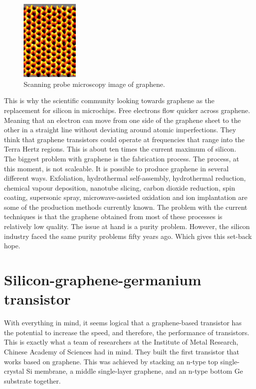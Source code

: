 \documentclass[conference, 10pt]{IEEEtran}
\begin{document}
\begin{figure}[H]
\centering
\includegraphics[width=0.25\textwidth, angle=90]{Img/graphene.jpg}
\caption{Scanning probe microscopy image of graphene. \cite{microscope}}
\label{fig:graphene}
\end{figure}

This is why the scientific community looking towards graphene as the replacement for silicon in microchips. Free electrons flow quicker across graphene. Meaning that an electron can move from one side of the graphene sheet to the other in a straight line without deviating around atomic imperfections. They think that graphene transistors could operate at frequencies that range into the Terra Hertz regions. This is about ten times the current maximum of silicon.\\

The biggest problem with graphene is the fabrication process. The process, at this moment, is not scaleable. It is possible to produce graphene in several different ways. Exfoliation, hydrothermal self-assembly, hydrothermal reduction, chemical vapour deposition, nanotube slicing, carbon dioxide reduction, spin coating, supersonic spray, microwave-assisted oxidation and ion implantation are some of the production methods currently known. The problem with the current techniques is that the graphene obtained from most of these processes is relatively low quality. The issue at hand is a purity problem. However, the silicon industry faced the same purity problems fifty years ago. Which gives this set-back hope. \cite{Production}\\

\section{Silicon-graphene-germanium transistor}
With everything in mind, it seems logical that a graphene-based transistor has the potential to increase the speed, and therefore, the performance of transistors. This is exactly what a team of researchers at the Institute of Metal Research, Chinese Academy of Sciences had in mind. They built the first transistor that works based on graphene. This was achieved by stacking an n-type top single-crystal Si membrane, a middle single-layer graphene, and an n-type bottom Ge substrate together. \cite{article1}\\
\end{document}
